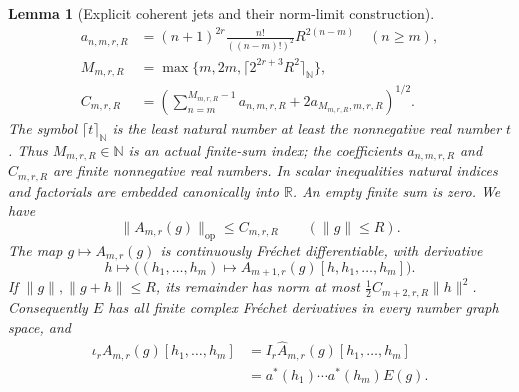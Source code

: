 \documentclass[11pt,a4paper]{article}
\newtheorem{lemma}[theorem]{Lemma}
\theoremstyle{definition}
\theoremstyle{remark}
\begin{document}
\begin{lemma}[Explicit coherent jets and their norm-limit construction]
\begin{align*}
 a_{n,m,r,R}&=(n+1)^{2r}\frac{n!}{((n-m)!)^2}R^{2(n-m)}\quad(n\geq m),\\
 M_{m,r,R}&=\max\{m,2m,\lceil 2^{2r+3}R^2\rceil_{\mathbb N}\},\\
 C_{m,r,R}&=\left(\sum_{n=m}^{M_{m,r,R}-1}a_{n,m,r,R}
                      +2a_{M_{m,r,R},m,r,R}\right)^{1/2}.
\end{align*}
The symbol $\lceil t\rceil_{\mathbb N}$ is the least natural
number at least the nonnegative real number $t$. Thus
$M_{m,r,R}\in\mathbb N$ is an actual finite-sum index;
the coefficients $a_{n,m,r,R}$ and $C_{m,r,R}$ are finite
nonnegative real numbers. In scalar inequalities natural indices
and factorials are embedded canonically into $\mathbb R$.
An empty finite sum is zero. We have
\[
 \|A_{m,r}(g)\|_{\mathrm{op}}\leq C_{m,r,R}\qquad(\|g\|\leq R). \tag{CJ2}
\]
The map $g\mapsto A_{m,r}(g)$ is continuously Fr\'echet
 differentiable, with derivative
\[
 h\longmapsto\big((h_1,\ldots,h_m)\longmapsto
             A_{m+1,r}(g)[h,h_1,\ldots,h_m]\big).                 \tag{CJ3}
\]
If $\|g\|,\|g+h\|\leq R$, its remainder has norm at most
$\tfrac12C_{m+2,r,R}\|h\|^2$. Consequently $E$ has all finite
complex Fr\'echet derivatives in every number graph space, and
\[
 \begin{aligned}
 \iota_r A_{m,r}(g)[h_1,\ldots,h_m]
   &=I_r\widehat A_{m,r}(g)[h_1,\ldots,h_m]\\
   &=a^*(h_1)\cdots a^*(h_m)E(g).
 \end{aligned}                                                \tag{CJ4}
\]
\end{lemma}
\end{document}
